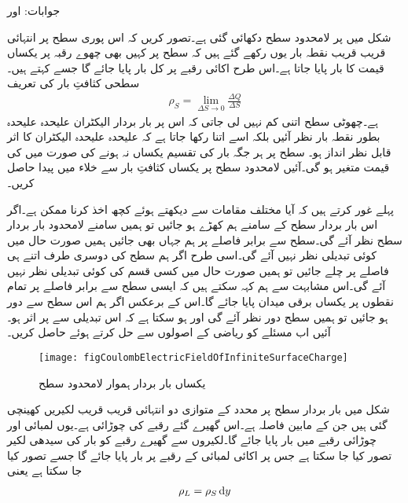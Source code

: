 جوابات: اور 

شکل  میں   پر لامحدود  سطح دکھائی گئی ہے۔تصور کریں کہ اس پوری  سطح پر انتہائی قریب قریب نقطہ بار یوں رکھے گئے ہیں کہ سطح پر کہیں بھی چھوے رقبہ  پر  یکساں قیمت کا بار  پایا جاتا ہے۔اس طرح اکائی رقبے پر کل  بار پایا جائے گا جسے   کہتے ہیں۔سطحی کثافتِ بار کی تعریف
\begin{align}\label{مساوات_کولمب_سطحی_کثافت_تعریف}
\rho_S=\lim_{\Delta S \to 0}\frac{\Delta Q}{\Delta S}
\end{align}
ہے۔چھوٹی سطح اتنی کم نہیں لی جاتی کہ اس پر بار بردار الیکٹران علیحدہ علیحدہ بطور نقطہ بار نظر آئیں بلکہ اسے اتنا رکھا جاتا ہے کہ علیحدہ علیحدہ الیکٹران کا اثر قابل نظر انداز ہو۔ سطح پر ہر جگہ بار کی تقسیم یکساں نہ ہونے کی صورت میں  کی قیمت متغیر ہو گی۔آئیں لامحدود سطح پر یکساں کثافتِ بار سے خلاء میں  پیدا  حاصل کریں۔

پہلے غور کرتے ہیں کہ آیا مختلف مقامات سے  دیکھتے ہوئے کچھ اخذ کرنا ممکن ہے۔اگر اس بار بردار سطح کے سامنے ہم کھڑے ہو جائیں تو ہمیں سامنے لامحدود بار بردار سطح نظر آئے گی۔سطح سے برابر فاصلے پر ہم جہاں بھی جائیں ہمیں صورت حال میں کوئی تبدیلی نظر نہیں آئے گی۔اسی طرح اگر ہم سطح کی دوسری طرف اتنے ہی فاصلے پر چلے جائیں تو ہمیں صورت حال میں کسی قسم کی کوئی تبدیلی نظر نہیں آئے گی۔اس مشابہت سے ہم کہہ سکتے ہیں کہ ایسی سطح سے برابر فاصلے پر تمام نقطوں  پر یکساں برقی میدان پایا جائے گا۔اس کے برعکس اگر ہم اس سطح سے دور ہو جائیں تو ہمیں سطح دور نظر آئے گی اور ہو سکتا ہے کہ اس تبدیلی سے  پر اثر ہو۔آئیں اب مسئلے کو ریاضی کے اصولوں سے حل کرتے ہوئے  حاصل کریں۔
\begin{figure}
\centering
\texttt{[image: figCoulombElectricFieldOfInfiniteSurfaceCharge]}
\caption{یکساں بار بردار ہموار لامحدود سطح}
\label{شکل_کولمب_لامحدود_سطح_پر_بار}
\end{figure}

شکل   میں بار بردار سطح پر   محدد کے متوازی دو انتہائی قریب قریب لکیریں کھینچی گئی ہیں جن کے مابین فاصلہ  ہے۔اس گھیرے گئے رقبے کی چوڑائی  ہے۔یوں  لمبائی اور  چوڑائی رقبے میں  بار پایا جائے گا۔لکیروں سے گھیرے رقبے کو بار کی سیدھی لکیر تصور کیا جا سکتا ہے جس پر اکائی لمبائی کے رقبے پر  بار پایا جائے گا جسے  تصور کیا جا سکتا ہے یعنی
\begin{align}
\rho_L=\rho_S \dif y
\end{align}

